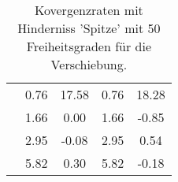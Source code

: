 \begin{table}
\begin{tabular}{c|cc|cc|}
\multicolumn{1}{|c|}{} & \multicolumn{1}{|c|}{      0.76} & \multicolumn{1}{|c|}{     17.58} & \multicolumn{1}{|c|}{      0.76} & \multicolumn{1}{|c|}{     18.28} \\ 
\multicolumn{1}{|c|}{} & \multicolumn{1}{|c|}{      1.66} & \multicolumn{1}{|c|}{      0.00} & \multicolumn{1}{|c|}{      1.66} & \multicolumn{1}{|c|}{     -0.85} \\ 
\multicolumn{1}{|c|}{} & \multicolumn{1}{|c|}{      2.95} & \multicolumn{1}{|c|}{     -0.08} & \multicolumn{1}{|c|}{      2.95} & \multicolumn{1}{|c|}{      0.54} \\ 
\multicolumn{1}{|c|}{} & \multicolumn{1}{|c|}{      5.82} & \multicolumn{1}{|c|}{      0.30} & \multicolumn{1}{|c|}{      5.82} & \multicolumn{1}{|c|}{     -0.18} \\ 
\hline 
\end{tabular}\caption{Kovergenzraten mit Hinderniss 'Spitze' mit 50 Freiheitsgraden für die Verschiebung.}\label{tab:Rate_Spitze_level1}
\end{table} 
